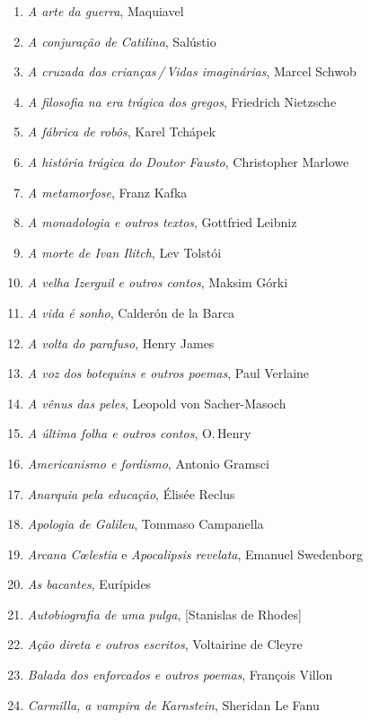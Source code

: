 \begin{enumerate}
\setlength{\topsep}{2pt}
\setlength{\partopsep}{0pt}
\setlength\parskip{4.2pt}
\setlength\itemsep{-1.4mm}
\item \textit{A arte da guerra}, Maquiavel
\item \textit{A conjuração de Catilina}, Salústio
\item \textit{A cruzada das crianças\,/\,Vidas imaginárias}, Marcel Schwob
\item \textit{A filosofia na era trágica dos gregos}, Friedrich Nietzsche
\item \textit{A fábrica de robôs}, Karel Tchápek 
\item \textit{A história trágica do Doutor Fausto}, Christopher Marlowe
\item \textit{A metamorfose}, Franz Kafka
\item \textit{A monadologia e outros textos}, Gottfried Leibniz
\item \textit{A morte de Ivan Ilitch}, Lev Tolstói 
\item \textit{A velha Izerguil e outros contos}, Maksim Górki
\item \textit{A vida é sonho}, Calderón de la Barca
\item \textit{A volta do parafuso}, Henry James
\item \textit{A voz dos botequins e outros poemas}, Paul Verlaine 
\item \textit{A vênus das peles}, Leopold von Sacher{}-Masoch
\item \textit{A última folha e outros contos}, O.\,Henry
\item \textit{Americanismo e fordismo}, Antonio Gramsci
\item \textit{Anarquia pela educação}, Élisée Reclus 
\item \textit{Apologia de Galileu}, Tommaso Campanella 
\item \textit{Arcana C\oe lestia} e \textit{Apocalipsis revelata}, Emanuel Swedenborg
\item \textit{As bacantes}, Eurípides
\item \textit{Autobiografia de uma pulga}, [Stanislas de Rhodes]
\item \textit{Ação direta e outros escritos}, Voltairine de Cleyre
\item \textit{Balada dos enforcados e outros poemas}, François Villon
\item \textit{Carmilla, a vampira de Karnstein}, Sheridan Le Fanu

\end{enumerate}
